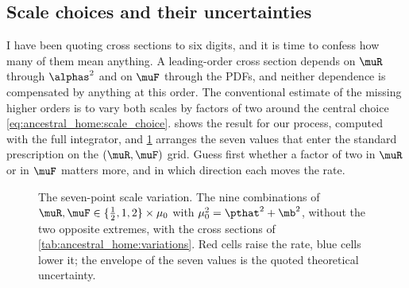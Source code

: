 \subsection{Scale choices and their uncertainties}
\label{sec:ancestral_home:scales}

I have been quoting cross sections to six digits, and it is time to confess
how many of them mean anything. A leading-order cross section depends on
$\muR$ through $\alphas^2$ and on $\muF$ through the PDFs, and neither
dependence is compensated by anything at this order. The conventional
estimate of the missing higher orders is to vary both scales by factors of
two around the central choice \cref{eq:ancestral_home:scale_choice}.
 shows the result for our process,
computed with the full integrator, and \cref{fig:ancestral_home:seven_point_sketch}
arranges the seven values that enter the standard prescription on the
$(\muR,\muF)$ grid. Guess first whether a factor of two in $\muR$ or in
$\muF$ matters more, and in which direction each moves the rate.

\begin{figure}[htbp]\centering
\resizebox{\textwidth}{!}{}
\caption[The seven-point scale variation on the $(\muR,\muF)$ grid]{The seven-point scale variation. The nine combinations of $\muR,\muF\in\{\tfrac12,1,2\}\times\mu_0$ with $\mu_0^2=\pthat^2+\mb^2$, without the two opposite extremes, with the cross sections of \cref{tab:ancestral_home:variations}. Red cells raise the rate, blue cells lower it; the envelope of the seven values is the quoted theoretical uncertainty.}
\label{fig:ancestral_home:seven_point_sketch}
\end{figure}

